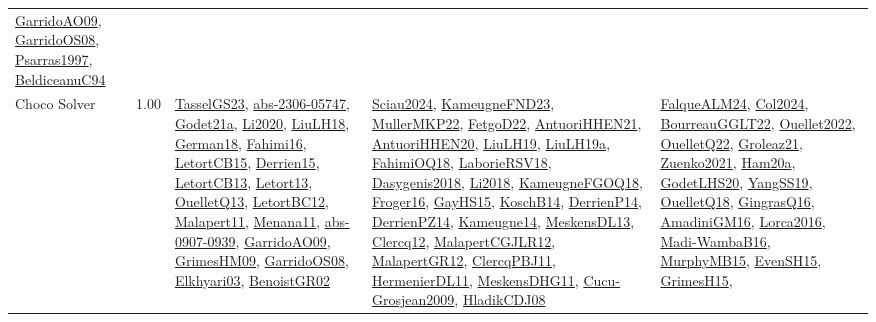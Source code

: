 {\begin{longtable}{p{3cm}r>{\raggedright\arraybackslash}p{6cm}>{\raggedright\arraybackslash}p{6cm}>{\raggedright\arraybackslash}p{8cm}}
\hyperref[detail:GarridoAO09]{GarridoAO09}, \hyperref[detail:GarridoOS08]{GarridoOS08}, \hyperref[detail:Psarras1997]{Psarras1997}, \hyperref[detail:BeldiceanuC94]{BeldiceanuC94}\\
\index{Choco Solver}\index{CPSystems!Choco Solver}Choco Solver &  1.00 & \hyperref[detail:TasselGS23]{TasselGS23}, \hyperref[detail:abs-2306-05747]{abs-2306-05747}, \hyperref[detail:Godet21a]{Godet21a}, \hyperref[detail:Li2020]{Li2020}, \hyperref[detail:LiuLH18]{LiuLH18}, \hyperref[detail:German18]{German18}, \hyperref[detail:Fahimi16]{Fahimi16}, \hyperref[detail:LetortCB15]{LetortCB15}, \hyperref[detail:Derrien15]{Derrien15}, \hyperref[detail:LetortCB13]{LetortCB13}, \hyperref[detail:Letort13]{Letort13}, \hyperref[detail:OuelletQ13]{OuelletQ13}, \hyperref[detail:LetortBC12]{LetortBC12}, \hyperref[detail:Malapert11]{Malapert11}, \hyperref[detail:Menana11]{Menana11}, \hyperref[detail:abs-0907-0939]{abs-0907-0939}, \hyperref[detail:GarridoAO09]{GarridoAO09}, \hyperref[detail:GrimesHM09]{GrimesHM09}, \hyperref[detail:GarridoOS08]{GarridoOS08}, \hyperref[detail:Elkhyari03]{Elkhyari03}, \hyperref[detail:BenoistGR02]{BenoistGR02} & \hyperref[detail:Sciau2024]{Sciau2024}, \hyperref[detail:KameugneFND23]{KameugneFND23}, \hyperref[detail:MullerMKP22]{MullerMKP22}, \hyperref[detail:FetgoD22]{FetgoD22}, \hyperref[detail:AntuoriHHEN21]{AntuoriHHEN21}, \hyperref[detail:AntuoriHHEN20]{AntuoriHHEN20}, \hyperref[detail:LiuLH19]{LiuLH19}, \hyperref[detail:LiuLH19a]{LiuLH19a}, \hyperref[detail:FahimiOQ18]{FahimiOQ18}, \hyperref[detail:LaborieRSV18]{LaborieRSV18}, \hyperref[detail:Dasygenis2018]{Dasygenis2018}, \hyperref[detail:Li2018]{Li2018}, \hyperref[detail:KameugneFGOQ18]{KameugneFGOQ18}, \hyperref[detail:Froger16]{Froger16}, \hyperref[detail:GayHS15]{GayHS15}, \hyperref[detail:KoschB14]{KoschB14}, \hyperref[detail:DerrienP14]{DerrienP14}, \hyperref[detail:DerrienPZ14]{DerrienPZ14}, \hyperref[detail:Kameugne14]{Kameugne14}, \hyperref[detail:MeskensDL13]{MeskensDL13}, \hyperref[detail:Clercq12]{Clercq12}, \hyperref[detail:MalapertCGJLR12]{MalapertCGJLR12}, \hyperref[detail:MalapertGR12]{MalapertGR12}, \hyperref[detail:ClercqPBJ11]{ClercqPBJ11}, \hyperref[detail:HermenierDL11]{HermenierDL11}, \hyperref[detail:MeskensDHG11]{MeskensDHG11}, \hyperref[detail:Cucu-Grosjean2009]{Cucu-Grosjean2009}, \hyperref[detail:HladikCDJ08]{HladikCDJ08} & \hyperref[detail:FalqueALM24]{FalqueALM24}, \hyperref[detail:Col2024]{Col2024}, \hyperref[detail:BourreauGGLT22]{BourreauGGLT22}, \hyperref[detail:Ouellet2022]{Ouellet2022}, \hyperref[detail:OuelletQ22]{OuelletQ22}, \hyperref[detail:Groleaz21]{Groleaz21}, \hyperref[detail:Zuenko2021]{Zuenko2021}, \hyperref[detail:Ham20a]{Ham20a}, \hyperref[detail:GodetLHS20]{GodetLHS20}, \hyperref[detail:YangSS19]{YangSS19}, \hyperref[detail:OuelletQ18]{OuelletQ18}, \hyperref[detail:GingrasQ16]{GingrasQ16}, \hyperref[detail:AmadiniGM16]{AmadiniGM16}, \hyperref[detail:Lorca2016]{Lorca2016}, \hyperref[detail:Madi-WambaB16]{Madi-WambaB16}, \hyperref[detail:MurphyMB15]{MurphyMB15}, \hyperref[detail:EvenSH15]{EvenSH15}, \hyperref[detail:GrimesH15]{GrimesH15}, 
\end{longtable}}
